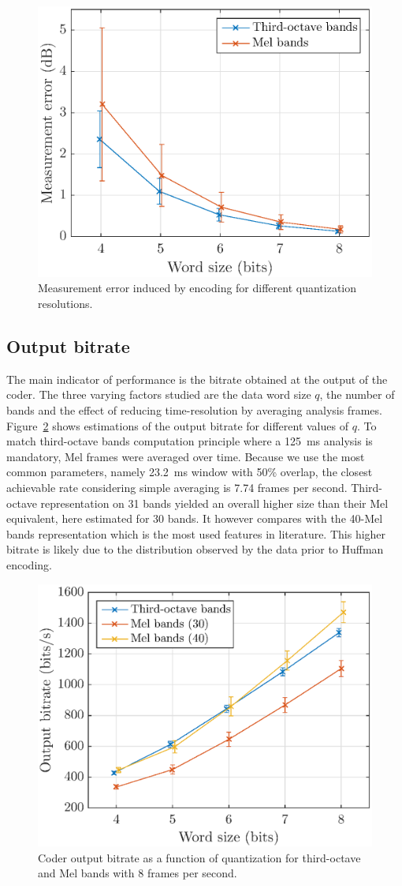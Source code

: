 \documentclass[12pt,times,onecolumn]{article}
\begin{document}
\begin{figure}[htbp]
	\centering
		\includegraphics[width=0.7\columnwidth]{figures/error_qall.eps}
	\caption{Measurement error induced by encoding for different quantization resolutions.}
	\label{fig:error_q}
\end{figure}

\subsection{Output bitrate}
The main indicator of performance is the bitrate obtained at the output of the coder. The three varying factors studied are the data word size $q$, the number of bands and the effect of reducing time-resolution by averaging analysis frames. Figure~\ref{fig:bitrate_q} shows estimations of the output bitrate for different values of $q$. To match third-octave bands computation principle where a 125~ms analysis is mandatory, Mel frames were averaged over time. Because we use the most common parameters, namely 23.2~ms window with 50\% overlap, the closest achievable rate considering simple averaging is 7.74 frames per second. Third-octave representation on 31 bands yielded an overall higher size than their Mel equivalent, here estimated for 30 bands. It however compares with the 40-Mel bands representation which is the most used features in literature. This higher bitrate is likely due to the distribution observed by the data prior to Huffman encoding.\\

\begin{figure}[htbp]
	\centering
		\includegraphics[width=0.7\columnwidth]{figures/bitrate_qall.eps}
	\caption{Coder output bitrate as a function of quantization for third-octave and Mel bands with 8 frames per second.}
	\label{fig:bitrate_q}
\end{figure}
\end{document}
